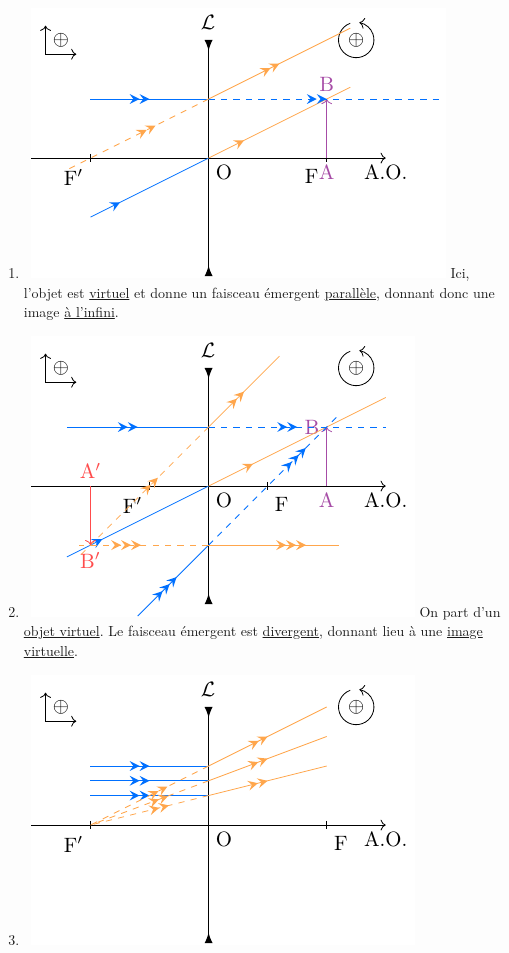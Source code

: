 \documentclass[../../main/main.tex]{subfiles}
\begin{document}
{\begin{multicols}{2}
\begin{enumerate}
			\item ~\smallbreak\includegraphics[width=\linewidth]{divCF}
			      Ici, l'objet est \underline{virtuel} et donne un faisceau émergent
			      \underline{parallèle}, donnant donc une image \underline{à l'infini}.
			\item ~\smallbreak\includegraphics[width=\linewidth]{divDF}
			      On part d'un \underline{objet virtuel}. Le faisceau émergent est
			      \underline{divergent}, donnant lieu à une \underline{image virtuelle}.
			      \columnbreak
			\item ~\smallbreak\includegraphics[width=\linewidth]{divHF}

\end{enumerate}
\end{multicols}}
\end{document}
